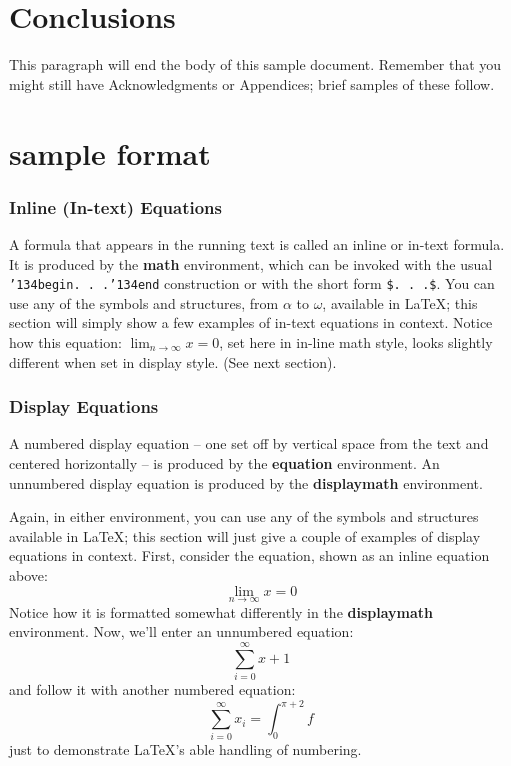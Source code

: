 \documentclass{sig-alternate-05-2015}
\begin{document}
\section{Conclusions}
This paragraph will end the body of this sample document.
Remember that you might still have Acknowledgments or
Appendices; brief samples of these
follow.




\section{sample format}

\subsubsection{Inline (In-text) Equations}
A formula that appears in the running text is called an
inline or in-text formula.  It is produced by the
\textbf{math} environment, which can be
invoked with the usual \texttt{{\char'134}begin. . .{\char'134}end}
construction or with the short form \texttt{\$. . .\$}. You
can use any of the symbols and structures,
from $\alpha$ to $\omega$, available in
\LaTeX\cite{Lamport:LaTeX}; this section will simply show a
few examples of in-text equations in context. Notice how
this equation: \begin{math}\lim_{n\rightarrow \infty}x=0\end{math},
set here in in-line math style, looks slightly different when
set in display style.  (See next section).

\subsubsection{Display Equations}
A numbered display equation -- one set off by vertical space
from the text and centered horizontally -- is produced
by the \textbf{equation} environment. An unnumbered display
equation is produced by the \textbf{displaymath} environment.

Again, in either environment, you can use any of the symbols
and structures available in \LaTeX; this section will just
give a couple of examples of display equations in context.
First, consider the equation, shown as an inline equation above:
\begin{equation}\lim_{n\rightarrow \infty}x=0\end{equation}
Notice how it is formatted somewhat differently in
the \textbf{displaymath}
environment.  Now, we'll enter an unnumbered equation:
\begin{displaymath}\sum_{i=0}^{\infty} x + 1\end{displaymath}
and follow it with another numbered equation:
\begin{equation}\sum_{i=0}^{\infty}x_i=\int_{0}^{\pi+2} f\end{equation}
just to demonstrate \LaTeX's able handling of numbering.
\end{document}
